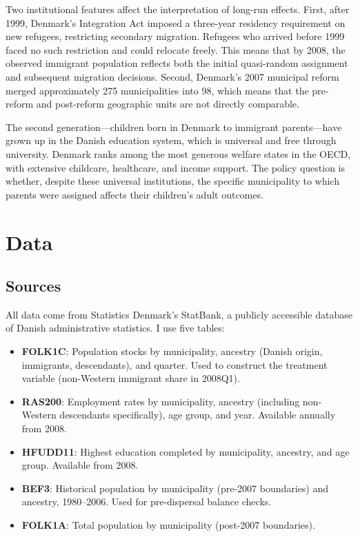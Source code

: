 \documentclass[12pt]{article}
\begin{document}
Two institutional features affect the interpretation of long-run effects. First, after 1999, Denmark's Integration Act imposed a three-year residency requirement on new refugees, restricting secondary migration. Refugees who arrived before 1999 faced no such restriction and could relocate freely. This means that by 2008, the observed immigrant population reflects both the initial quasi-random assignment and subsequent migration decisions. Second, Denmark's 2007 municipal reform merged approximately 275 municipalities into 98, which means that the pre-reform and post-reform geographic units are not directly comparable.

The second generation---children born in Denmark to immigrant parents---have grown up in the Danish education system, which is universal and free through university. Denmark ranks among the most generous welfare states in the OECD, with extensive childcare, healthcare, and income support. The policy question is whether, despite these universal institutions, the specific municipality to which parents were assigned affects their children's adult outcomes.

\section{Data}

\subsection{Sources}

All data come from Statistics Denmark's StatBank, a publicly accessible database of Danish administrative statistics. I use five tables:

\begin{itemize}
\item \textbf{FOLK1C}: Population stocks by municipality, ancestry (Danish origin, immigrants, descendants), and quarter. Used to construct the treatment variable (non-Western immigrant share in 2008Q1).
\item \textbf{RAS200}: Employment rates by municipality, ancestry (including non-Western descendants specifically), age group, and year. Available annually from 2008.
\item \textbf{HFUDD11}: Highest education completed by municipality, ancestry, and age group. Available from 2008.
\item \textbf{BEF3}: Historical population by municipality (pre-2007 boundaries) and ancestry, 1980--2006. Used for pre-dispersal balance checks.
\item \textbf{FOLK1A}: Total population by municipality (post-2007 boundaries).
\end{itemize}
\end{document}
